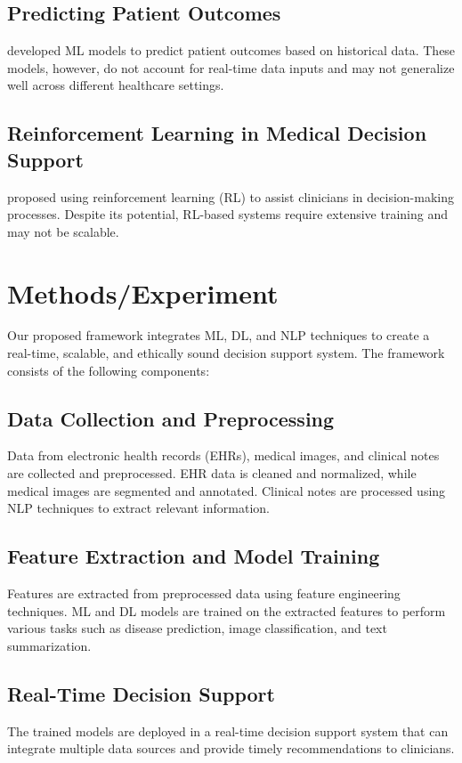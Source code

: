 \documentclass{article}
\begin{document}
\subsection{Predicting Patient Outcomes}
\cite{ZhangWang2021} developed ML models to predict patient outcomes based on historical data. These models, however, do not account for real-time data inputs and may not generalize well across different healthcare settings.

\subsection{Reinforcement Learning in Medical Decision Support}
\cite{ChenLi2020} proposed using reinforcement learning (RL) to assist clinicians in decision-making processes. Despite its potential, RL-based systems require extensive training and may not be scalable.

\section{Methods/Experiment}
\label{sec:methods}

Our proposed framework integrates ML, DL, and NLP techniques to create a real-time, scalable, and ethically sound decision support system. The framework consists of the following components:

\subsection{Data Collection and Preprocessing}
Data from electronic health records (EHRs), medical images, and clinical notes are collected and preprocessed. EHR data is cleaned and normalized, while medical images are segmented and annotated. Clinical notes are processed using NLP techniques to extract relevant information.

\subsection{Feature Extraction and Model Training}
Features are extracted from preprocessed data using feature engineering techniques. ML and DL models are trained on the extracted features to perform various tasks such as disease prediction, image classification, and text summarization.

\subsection{Real-Time Decision Support}
The trained models are deployed in a real-time decision support system that can integrate multiple data sources and provide timely recommendations to clinicians.
\end{document}
